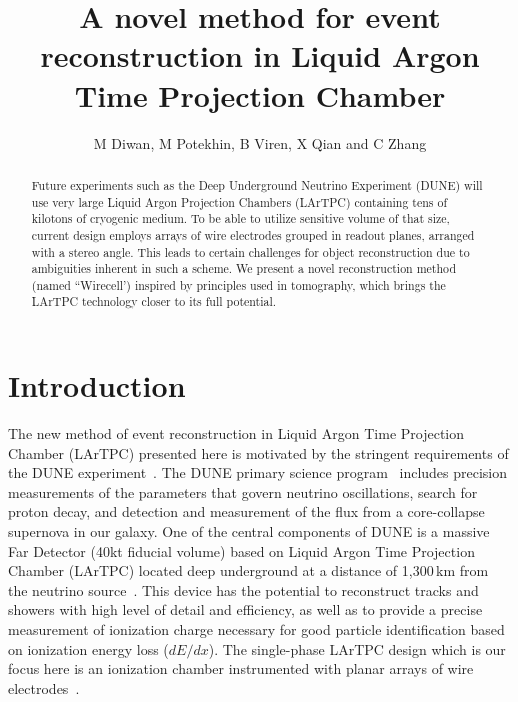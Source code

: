\documentclass[a4paper]{jpconf}
\begin{document}
\title{A novel method for event reconstruction in Liquid Argon Time Projection Chamber}

\author{M Diwan, M Potekhin, B Viren, X Qian and C Zhang}

\address{Brookhaven National Laboratory, Upton, NY11973, USA}



\begin{abstract}
Future experiments such as the Deep Underground Neutrino Experiment (DUNE) will use very large
Liquid Argon Projection Chambers (LArTPC) containing tens of kilotons of cryogenic medium. To be able to utilize
sensitive volume  of that size, current design employs arrays of wire electrodes
grouped in readout planes, arranged with a stereo angle. This leads to certain challenges for object reconstruction
due to ambiguities inherent in such a scheme. We present a novel reconstruction method (named ``Wirecell')
inspired by principles used in tomography, which brings the LArTPC technology closer to its full potential.
\end{abstract}

\section{Introduction}

The new method of event reconstruction in Liquid Argon Time Projection Chamber (LArTPC) presented here
is motivated by the stringent requirements of the DUNE experiment~\cite{cdrVol1}. The DUNE primary science
program~\cite{cdrVol2} includes precision measurements of the parameters that govern neutrino oscillations,
search for proton decay, and detection and measurement of the  flux from a core-collapse supernova in our galaxy.
One of the central components of DUNE is a massive Far Detector (40kt fiducial volume) based on Liquid Argon Time Projection Chamber (LArTPC)
located deep underground at a distance of 1,300\,km from the neutrino source~\cite{cdrVol4}.
This device  has the potential to reconstruct tracks and showers with  high level of detail and  efficiency,
as well as to provide a precise measurement of ionization charge necessary for good particle identification based on ionization energy loss ($dE/dx$).
The single-phase LArTPC design which is our focus here is an ionization chamber instrumented with planar arrays of wire electrodes~\cite{cdrVol4}.
\end{document}
